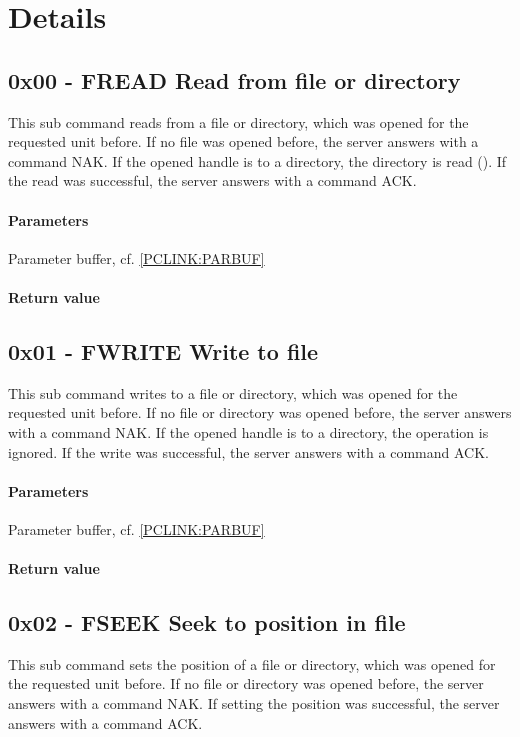 \documentclass[10pt]{article}
\begin{document}
\section{Details}
\subsection{0x00 - FREAD Read from file or directory }
This sub command reads from a file or directory, which was opened for the requested unit before. If no file was opened before, the server answers with a command NAK.
If the opened handle is to a directory, the directory is read ().
If the read was successful, the server answers with a command ACK.

\paragraph{Parameters}
Parameter buffer, cf. \ref{PCLINK:PARBUF}

\paragraph{Return value}

\subsection{0x01 - FWRITE Write to file }
This sub command writes to a file or directory, which was opened for the requested unit before. If no file or directory was opened before, the server answers with a command NAK.
If the opened handle is to a directory, the operation is ignored.
If the write was successful, the server answers with a command ACK.

\paragraph{Parameters}
Parameter buffer, cf. \ref{PCLINK:PARBUF}

\paragraph{Return value}

\subsection{0x02 - FSEEK Seek to position in file }
This sub command sets the position of a file or directory, which was opened for the requested unit before. If no file or directory was opened before, the server answers with a command NAK.
If setting the position was successful, the server answers with a command ACK.
\end{document}
